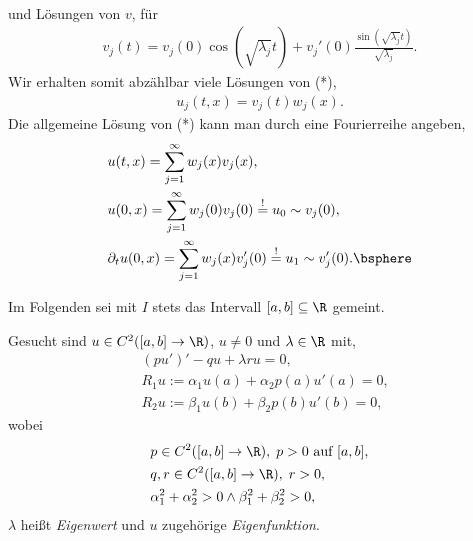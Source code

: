 \begin{bsp}
\begin{align*}
\end{align*}
und Lösungen von $v$, für
\begin{align*}
v_j(t) = v_j(0)\cos\left(\sqrt{\lambda_j}t\right) +
v_j'(0)\frac{\sin\left(\sqrt{\lambda_j}t \right)}{\sqrt{\lambda_j}}.
\end{align*}
Wir erhalten somit abzählbar viele Lösungen von (*),
\begin{align*}
u_j(t,x) = v_j(t)w_j(x).
\end{align*}
Die allgemeine Lösung von (*) kann man durch eine Fourierreihe angeben,
\begin{align*}
&u(t,x) = \sum\limits_{j=1}^\infty w_j(x)v_j(x),\\
&u(0,x) = \sum\limits_{j=1}^\infty w_j(0)v_j(0) \overset{!}{=} u_0 \sim
v_j(0),\\
&\partial_t u(0,x) = \sum\limits_{j=1}^\infty w_j(x)v_j'(0) \overset{!}{=} u_1
\sim v_j'(0).\bsphere
\end{align*}
\end{bsp}

Im Folgenden sei mit $I$ stets das Intervall $[a,b]\subseteq\R$ gemeint. 

\begin{prop}
\label{prop:1.32}
Gesucht sind $u\in C^2([a,b]\to\R)$, $u\neq 0$ und $\lambda\in\R$ mit,
\begin{align*}
&(pu')' - qu + \lambda ru = 0,\tag{1.1}\\
&R_1u := \alpha_1u(a) + \alpha_2p(a)u'(a) = 0,\\
&R_2u := \beta_1u(b) + \beta_2p(b)u'(b) = 0,
\end{align*}
wobei
\begin{align*}
&p\in C^2([a,b]\to\R),\; p>0\text{ auf }[a,b],\\
&q,r\in C^2([a,b]\to\R),\; r > 0,\\
&\alpha_1^2 + \alpha_2^2 > 0 \land \beta_1^2+\beta_2^2 > 0,
\end{align*}
$\lambda$ heißt \emph{Eigenwert} und $u$ zugehörige
\emph{Eigenfunktion}.\fishhere
\end{prop}

